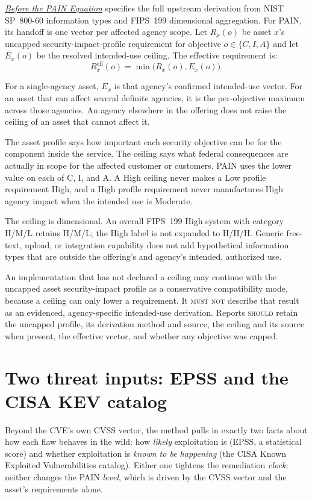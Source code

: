 \documentclass[11pt]{article}
\newcommand{\rfckw}[1]{\textsc{#1}}
\newcommand{\ceilingpaper}{\href{https://stackarmor.github.io/rfc-fedramp-vdr/vdr-pain-security-requirements.pdf}{\emph{Before the PAIN Equation}}}
\begin{document}
\ceilingpaper{} specifies the full upstream derivation from NIST SP~800-60
information types and FIPS~199 dimensional aggregation. For PAIN, its handoff is
one vector per affected agency scope. Let $R_x(o)$ be asset $x$'s uncapped
security-impact-profile requirement for objective $o\in\{C,I,A\}$ and let $E_x(o)$ be the resolved
intended-use ceiling. The effective requirement is:
\begin{equation}
R_x^{\mathrm{eff}}(o)=\min\big(R_x(o),E_x(o)\big).
\label{eq:effective-requirement}
\end{equation}

For a single-agency asset, $E_x$ is that agency's confirmed intended-use vector.
For an asset that can affect several definite agencies, it is the per-objective
maximum across those agencies. An agency elsewhere in the offering does not raise
the ceiling of an asset that cannot affect it.

\begin{plain}
The asset profile says how important each security objective can be for the
component inside the service. The ceiling says what federal consequences are
actually in scope for the affected customer or customers. PAIN uses the lower value
on each of C, I, and A. A High ceiling never makes a Low profile requirement High,
and a High profile requirement never manufactures High agency impact when the
intended use is Moderate.
\end{plain}

The ceiling is dimensional. An overall FIPS~199 High system with category H/M/L
retains H/M/L; the High label is not expanded to H/H/H. Generic free-text, upload,
or integration capability does not add hypothetical information types that are
outside the offering's and agency's intended, authorized use.

An implementation that has not declared a ceiling may continue with the uncapped
asset security-impact profile as a conservative compatibility mode, because a ceiling can only
lower a requirement. It \rfckw{must not} describe that result as an evidenced,
agency-specific intended-use derivation. Reports \rfckw{should} retain the
uncapped profile, its derivation method and source, the ceiling and its source when
present, the effective vector, and whether any objective was capped.

\section{Two threat inputs: EPSS and the CISA KEV catalog}
\label{sec:enrichment}
\begin{plain}
Beyond the CVE's own CVSS vector, the method pulls in exactly two facts about how each
flaw behaves in the wild: how \emph{likely} exploitation is (EPSS, a statistical
score) and whether exploitation is \emph{known to be happening} (the CISA Known
Exploited Vulnerabilities catalog). Either one tightens the remediation \emph{clock};
neither changes the PAIN \emph{level}, which is driven by the CVSS vector and the
asset's requirements alone.
\end{plain}
\end{document}
